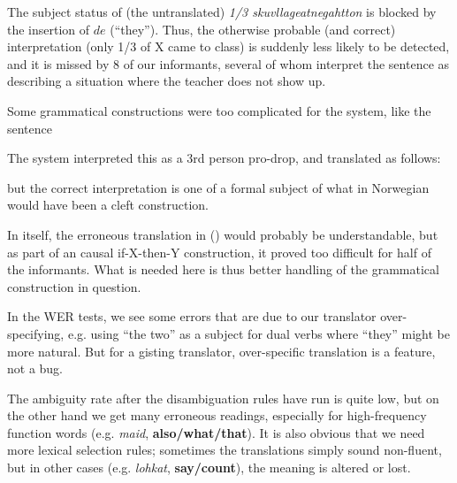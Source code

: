 \documentclass{book}
\begin{document}

The subject status of (the untranslated) \textit{1/3
  skuvllageatnegahtton} is blocked by the insertion of $de$
(``they''). Thus, the otherwise probable (and correct) interpretation
(only 1/3 of X came to class) is suddenly less likely to be detected,
and it is missed by 8 of our informants, several of whom interpret
the sentence as describing a situation where the teacher does not show up.



Some grammatical constructions were too complicated for the system, 
like the sentence



The system interpreted this as a 3rd person pro-drop, and translated
as follows:

but the correct interpretation is one of a formal subject of
what in Norwegian would have been a cleft construction.

In itself, the erroneous translation in () would probably be
understandable, but as part of an causal if-X-then-Y construction, it
proved too difficult for half of the informants. What is needed here
is thus better handling of the grammatical construction in question.

In the WER tests, we see some errors that are due to our translator
over-specifying, e.g. using ``the two'' as a subject for dual verbs
where ``they'' might be more natural. But for a gisting translator,
over-specific translation is a feature, not a bug.

The ambiguity rate after the disambiguation rules have run is quite
low, but on the other hand we get many erroneous readings, especially
for high-frequency function words (e.g. \textit{maid},
\textbf{also/what/that}). It is also obvious that we need more lexical
selection rules; sometimes the translations simply sound non-fluent,
but in other cases (e.g. \textit{lohkat}, \textbf{say/count}), the
meaning is altered or lost.
\end{document}
